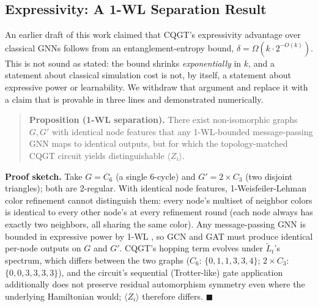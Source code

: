 \documentclass[journal]{IEEEtran}
\begin{document}
\subsection{Expressivity: A 1-WL Separation Result}
\label{sec:wl}

An earlier draft of this work claimed that CQGT's expressivity advantage
over classical GNNs follows from an entanglement-entropy bound,
$\delta = \Omega(k \cdot 2^{-O(k)})$. This is not sound as stated: the
bound shrinks \emph{exponentially} in $k$, and a statement about
classical simulation cost is not, by itself, a statement about
expressive power or learnability. We withdraw that argument and replace
it with a claim that is provable in three lines and demonstrated
numerically.

\begin{quote}
\textbf{Proposition (1-WL separation).} There exist non-isomorphic graphs
$G, G'$ with identical node features that any 1-WL-bounded message-passing
GNN maps to identical outputs, but for which the topology-matched CQGT
circuit yields distinguishable $\langle Z_i \rangle$.
\end{quote}

\textbf{Proof sketch.} Take $G = C_6$ (a single 6-cycle) and
$G' = 2{\times}C_3$ (two disjoint triangles); both are 2-regular. With
identical node features, 1-Weisfeiler-Lehman color refinement cannot
distinguish them: every node's multiset of neighbor colors is identical
to every other node's at every refinement round (each node always has
exactly two neighbors, all sharing the same color). Any message-passing
GNN is bounded in expressive power by 1-WL \cite{xu2019gin}, so GCN and
GAT must produce identical per-node outputs on $G$ and $G'$. CQGT's
hopping term evolves under $\tilde L_t$'s spectrum, which differs between
the two graphs ($C_6$: $\{0,1,1,3,3,4\}$; $2{\times}C_3$:
$\{0,0,3,3,3,3\}$), and the circuit's sequential (Trotter-like) gate
application additionally does not preserve residual automorphism
symmetry even where the underlying Hamiltonian would; $\langle Z_i
\rangle$ therefore differs. $\blacksquare$
\end{document}
